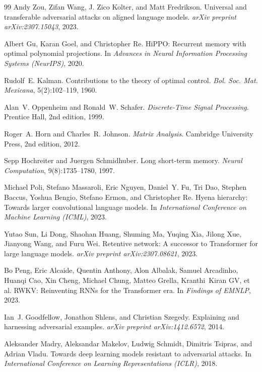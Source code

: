 \documentclass[10pt,twocolumn]{article}
\begin{document}
\begin{thebibliography}{99}
Andy Zou, Zifan Wang, J. Zico Kolter, and Matt Fredrikson.
\newblock Universal and transferable adversarial attacks on aligned language models.
\newblock \emph{arXiv preprint arXiv:2307.15043}, 2023.

Albert Gu, Karan Goel, and Christopher Re.
\newblock HiPPO: Recurrent memory with optimal polynomial projections.
\newblock In \emph{Advances in Neural Information Processing Systems (NeurIPS)}, 2020.

Rudolf~E. Kalman.
\newblock Contributions to the theory of optimal control.
\newblock \emph{Bol. Soc. Mat. Mexicana}, 5(2):102--119, 1960.

Alan~V. Oppenheim and Ronald~W. Schafer.
\newblock \emph{Discrete-Time Signal Processing}.
\newblock Prentice Hall, 2nd edition, 1999.

Roger~A. Horn and Charles~R. Johnson.
\newblock \emph{Matrix Analysis}.
\newblock Cambridge University Press, 2nd edition, 2012.

Sepp Hochreiter and Juergen Schmidhuber.
\newblock Long short-term memory.
\newblock \emph{Neural Computation}, 9(8):1735--1780, 1997.

Michael Poli, Stefano Massaroli, Eric Nguyen, Daniel~Y. Fu, Tri Dao, Stephen Baccus, Yoshua Bengio, Stefano Ermon, and Christopher Re.
\newblock Hyena hierarchy: Towards larger convolutional language models.
\newblock In \emph{International Conference on Machine Learning (ICML)}, 2023.

Yutao Sun, Li Dong, Shaohan Huang, Shuming Ma, Yuqing Xia, Jilong Xue, Jianyong Wang, and Furu Wei.
\newblock Retentive network: A successor to Transformer for large language models.
\newblock \emph{arXiv preprint arXiv:2307.08621}, 2023.

Bo Peng, Eric Alcaide, Quentin Anthony, Alon Albalak, Samuel Arcadinho, Huanqi Cao, Xin Cheng, Michael Chung, Matteo Grella, Kranthi~Kiran GV, et al.
\newblock RWKV: Reinventing RNNs for the Transformer era.
\newblock In \emph{Findings of EMNLP}, 2023.

Ian~J. Goodfellow, Jonathon Shlens, and Christian Szegedy.
\newblock Explaining and harnessing adversarial examples.
\newblock \emph{arXiv preprint arXiv:1412.6572}, 2014.

Aleksander Madry, Aleksandar Makelov, Ludwig Schmidt, Dimitris Tsipras, and Adrian Vladu.
\newblock Towards deep learning models resistant to adversarial attacks.
\newblock In \emph{International Conference on Learning Representations (ICLR)}, 2018.


\end{thebibliography}
\end{document}

